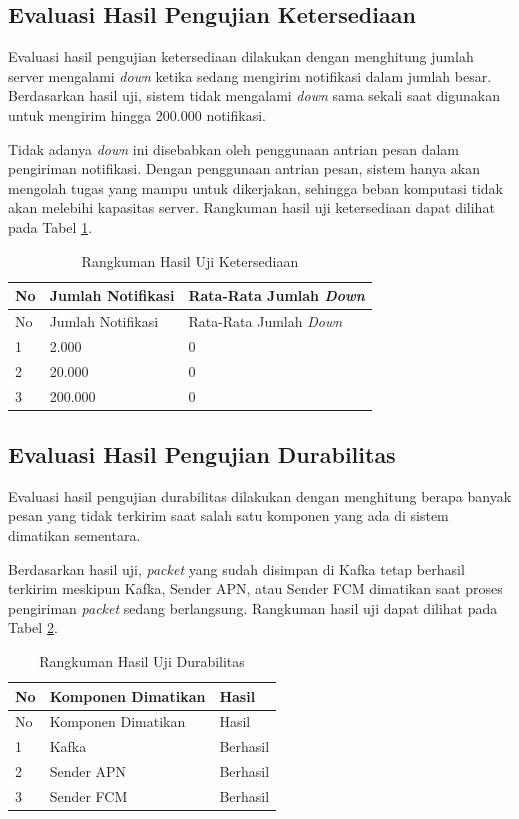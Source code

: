 \subsection{Evaluasi Hasil Pengujian Ketersediaan}
\par Evaluasi hasil pengujian ketersediaan dilakukan dengan menghitung jumlah server mengalami \textit{down} ketika sedang mengirim notifikasi dalam jumlah besar. Berdasarkan hasil uji, sistem tidak mengalami \textit{down} sama sekali saat digunakan untuk mengirim hingga 200.000 notifikasi.
\par Tidak adanya \textit{down} ini disebabkan oleh penggunaan antrian pesan dalam pengiriman notifikasi. Dengan penggunaan antrian pesan, sistem hanya akan mengolah tugas yang mampu untuk dikerjakan, sehingga beban komputasi tidak akan melebihi kapasitas server. Rangkuman hasil uji ketersediaan dapat dilihat pada Tabel \ref{t:rangkuman-ketersediaan}.
\begin{longtable}{|p{0.5cm}|p{3cm}|p{4cm}|}
	\caption{Rangkuman Hasil Uji Ketersediaan} \label{t:rangkuman-ketersediaan} \\ \hline
	\rowcolor{lightgray} No & Jumlah Notifikasi & Rata-Rata Jumlah \textit{Down} \\ \hline
	\endfirsthead
	\hline
	\rowcolor{lightgray} No & Jumlah Notifikasi & Rata-Rata Jumlah \textit{Down} \\ \hline
	\endhead
	1 & 2.000 & 0 \\ \hline
	2 & 20.000 & 0 \\ \hline
	3 & 200.000 & 0 \\ \hline
\end{longtable}

\subsection{Evaluasi Hasil Pengujian Durabilitas}
\par Evaluasi hasil pengujian durabilitas dilakukan dengan menghitung berapa banyak pesan yang tidak terkirim saat salah satu komponen yang ada di sistem dimatikan sementara.
\par Berdasarkan hasil uji, \textit{packet} yang sudah disimpan di Kafka tetap berhasil terkirim meskipun Kafka, Sender APN, atau Sender FCM dimatikan saat proses pengiriman \textit{packet} sedang berlangsung. Rangkuman hasil uji dapat dilihat pada Tabel \ref{t:rangkuman-durabilitas}.
\begin{longtable}{|p{0.5cm}|p{3.5cm}|p{2cm}|}
	\caption{Rangkuman Hasil Uji Durabilitas} \label{t:rangkuman-durabilitas} \\ \hline
	\rowcolor{lightgray} No & Komponen Dimatikan & Hasil \\ \hline 
	\endfirsthead
	\hline
	\rowcolor{lightgray} No & Komponen Dimatikan & Hasil \\ \hline 
	\endhead
	1 & Kafka & Berhasil \\ \hline
	2 & Sender APN & Berhasil \\ \hline
	3 & Sender FCM & Berhasil \\ \hline
\end{longtable}
